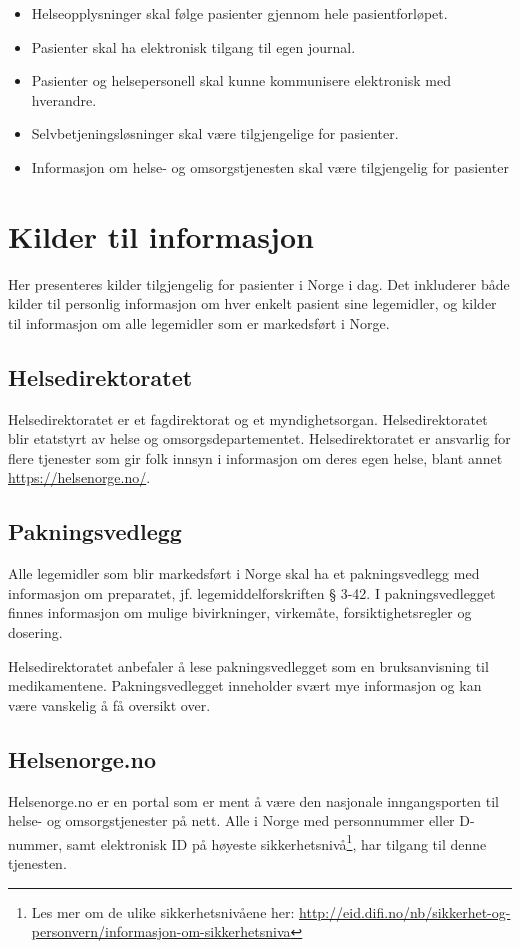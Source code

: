 \begin{itemize}
 \item Helseopplysninger skal følge pasienter gjennom hele pasientforløpet.
 \item Pasienter skal ha elektronisk tilgang til egen journal.
 \item Pasienter og helsepersonell skal kunne kommunisere elektronisk med hverandre.
 \item Selvbetjeningsløsninger skal være tilgjengelige for pasienter.
 \item Informasjon om helse- og omsorgstjenesten skal være tilgjengelig for pasienter
\end{itemize}

\section{Kilder til informasjon}
Her presenteres kilder tilgjengelig for pasienter i Norge i dag. Det inkluderer både kilder til personlig informasjon om hver enkelt pasient sine legemidler, og kilder til informasjon om alle legemidler som er markedsført i Norge. 

\subsection{Helsedirektoratet}
Helsedirektoratet er et fagdirektorat og et myndighetsorgan. Helsedirektoratet blir etatstyrt av helse og omsorgsdepartementet. Helsedirektoratet er ansvarlig for flere tjenester som gir folk innsyn i informasjon om deres egen helse, blant annet \url{https://helsenorge.no/}. 

\subsection{Pakningsvedlegg}
Alle legemidler som blir markedsført i Norge skal ha et pakningsvedlegg med informasjon om preparatet, jf. legemiddelforskriften § 3-42. I pakningsvedlegget finnes informasjon om mulige bivirkninger, virkemåte, forsiktighetsregler og dosering.

Helsedirektoratet anbefaler å lese pakningsvedlegget som en bruksanvisning til medikamentene. Pakningsvedlegget inneholder svært mye informasjon og kan være vanskelig å få oversikt over. 

\subsection{Helsenorge.no}
Helsenorge.no er en portal som er ment å være den nasjonale inngangsporten til helse- og omsorgstjenester på nett. Alle i Norge med personnummer eller D-nummer, samt elektronisk ID på høyeste sikkerhetsnivå\footnote{Les mer om de ulike sikkerhetsnivåene her: \url{http://eid.difi.no/nb/sikkerhet-og-personvern/informasjon-om-sikkerhetsniva}}, har tilgang til denne tjenesten. 

